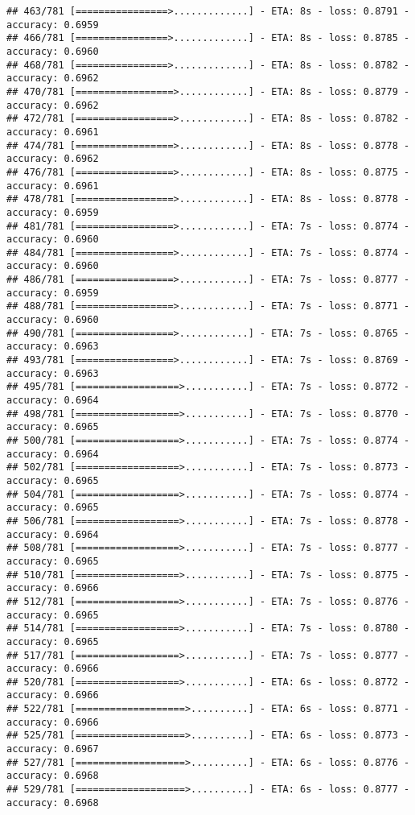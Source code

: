 \documentclass[
]{article}
\begin{document}
\begin{verbatim}
## 463/781 [================>.............] - ETA: 8s - loss: 0.8791 - accuracy: 0.6959
## 466/781 [================>.............] - ETA: 8s - loss: 0.8785 - accuracy: 0.6960
## 468/781 [================>.............] - ETA: 8s - loss: 0.8782 - accuracy: 0.6962
## 470/781 [=================>............] - ETA: 8s - loss: 0.8779 - accuracy: 0.6962
## 472/781 [=================>............] - ETA: 8s - loss: 0.8782 - accuracy: 0.6961
## 474/781 [=================>............] - ETA: 8s - loss: 0.8778 - accuracy: 0.6962
## 476/781 [=================>............] - ETA: 8s - loss: 0.8775 - accuracy: 0.6961
## 478/781 [=================>............] - ETA: 8s - loss: 0.8778 - accuracy: 0.6959
## 481/781 [=================>............] - ETA: 7s - loss: 0.8774 - accuracy: 0.6960
## 484/781 [=================>............] - ETA: 7s - loss: 0.8774 - accuracy: 0.6960
## 486/781 [=================>............] - ETA: 7s - loss: 0.8777 - accuracy: 0.6959
## 488/781 [=================>............] - ETA: 7s - loss: 0.8771 - accuracy: 0.6960
## 490/781 [=================>............] - ETA: 7s - loss: 0.8765 - accuracy: 0.6963
## 493/781 [=================>............] - ETA: 7s - loss: 0.8769 - accuracy: 0.6963
## 495/781 [==================>...........] - ETA: 7s - loss: 0.8772 - accuracy: 0.6964
## 498/781 [==================>...........] - ETA: 7s - loss: 0.8770 - accuracy: 0.6965
## 500/781 [==================>...........] - ETA: 7s - loss: 0.8774 - accuracy: 0.6964
## 502/781 [==================>...........] - ETA: 7s - loss: 0.8773 - accuracy: 0.6965
## 504/781 [==================>...........] - ETA: 7s - loss: 0.8774 - accuracy: 0.6965
## 506/781 [==================>...........] - ETA: 7s - loss: 0.8778 - accuracy: 0.6964
## 508/781 [==================>...........] - ETA: 7s - loss: 0.8777 - accuracy: 0.6965
## 510/781 [==================>...........] - ETA: 7s - loss: 0.8775 - accuracy: 0.6966
## 512/781 [==================>...........] - ETA: 7s - loss: 0.8776 - accuracy: 0.6965
## 514/781 [==================>...........] - ETA: 7s - loss: 0.8780 - accuracy: 0.6965
## 517/781 [==================>...........] - ETA: 7s - loss: 0.8777 - accuracy: 0.6966
## 520/781 [==================>...........] - ETA: 6s - loss: 0.8772 - accuracy: 0.6966
## 522/781 [===================>..........] - ETA: 6s - loss: 0.8771 - accuracy: 0.6966
## 525/781 [===================>..........] - ETA: 6s - loss: 0.8773 - accuracy: 0.6967
## 527/781 [===================>..........] - ETA: 6s - loss: 0.8776 - accuracy: 0.6968
## 529/781 [===================>..........] - ETA: 6s - loss: 0.8777 - accuracy: 0.6968

\end{verbatim}
\end{document}
